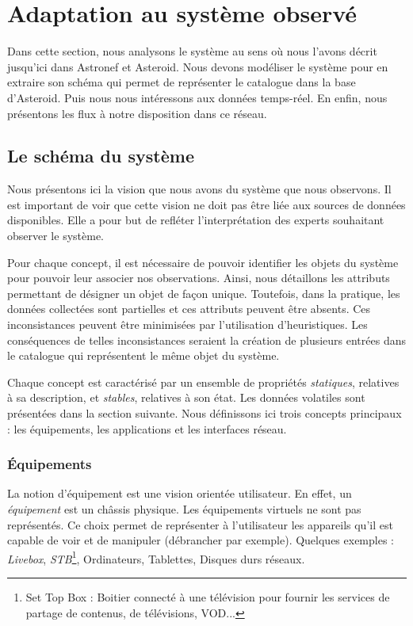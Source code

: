 \section{Adaptation au système observé}\label{sec:valid:domvision:systeme}
Dans cette section, nous analysons le système au sens où nous l'avons décrit jusqu'ici dans Astronef et Asteroid. Nous devons modéliser le système pour en extraire son schéma qui permet de représenter le catalogue dans la base d'Asteroid. Puis nous nous intéressons aux données temps-réel. En enfin, nous présentons les flux à notre disposition dans ce réseau.

\subsection{Le schéma du système}
Nous présentons ici la vision que nous avons du système que nous observons. Il est important de voir que cette vision ne doit pas être liée aux sources de données disponibles. Elle a pour but de refléter l'interprétation des experts souhaitant observer le système.

Pour chaque concept, il est nécessaire de pouvoir identifier les objets du système pour pouvoir leur associer nos observations. Ainsi, nous détaillons les attributs permettant de désigner un objet de façon unique. Toutefois, dans la pratique, les données collectées sont partielles et ces attributs peuvent être absents. Ces inconsistances peuvent être minimisées par l'utilisation d'heuristiques. Les conséquences de telles inconsistances seraient la création de plusieurs entrées dans le catalogue qui représentent le même objet du système.

Chaque concept est caractérisé par un ensemble de propriétés \textit{statiques}, relatives à sa description, et \textit{stables}, relatives à son état. Les données volatiles sont présentées dans la section suivante. Nous définissons ici trois concepts principaux : les équipements, les applications et les interfaces réseau.

\subsubsection{Équipements}
La notion d'équipement est une vision orientée utilisateur. En effet, un \textit{équipement} est un châssis physique. Les équipements virtuels ne sont pas représentés. Ce choix permet de représenter à l'utilisateur les appareils qu'il est capable de voir et de manipuler (débrancher par exemple). Quelques exemples : \textit{Livebox}, \textit{STB}\footnote{Set Top Box : Boitier connecté à une télévision pour fournir les services de partage de contenus, de télévisions, VOD...}, Ordinateurs, Tablettes, Disques durs réseaux.

